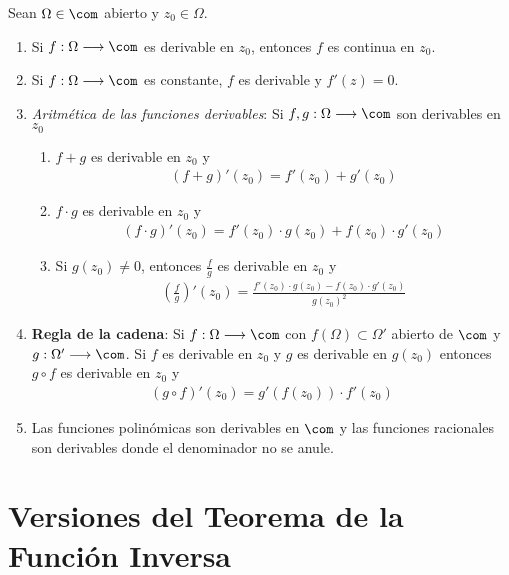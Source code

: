 \begin{obs}
Sean $\Omega \in \com$ abierto y $z_0 \in \Omega$.
\begin{enumerate}
    \item Si $f : \Omega \longrightarrow \com$ es derivable en $z_0$, entonces $f$ es continua en $z_0$.
    \item Si $f: \Omega \longrightarrow \com$ es constante, $f$ es derivable y $f'(z) = 0$.
    \item \textit{Aritmética de las funciones derivables}: Si $f,g: \Omega \longrightarrow \com$ son derivables en $z_0$
    \begin{enumerate}
        \item $f + g$ es derivable en $z_0$ y 
        \begin{align*}
            (f + g)'(z_0) = f'(z_0) + g'(z_0)
        \end{align*}
        \item $f \cdot g$ es derivable en $z_0$ y 
        \begin{align*}
            (f \cdot g)'(z_0) = f'(z_0)\cdot g(z_0) + f(z_0) \cdot g'(z_0)
        \end{align*}
        \item Si $g(z_0) \not = 0$, entonces $\frac{f}{g}$ es derivable en $z_0$ y 
        \begin{align*}
            \left(\frac{f}{g}\right)'(z_0) = \frac{f'(z_0)\cdot g(z_0) - f(z_0) \cdot g'(z_0)}{g(z_0)^2}
        \end{align*}
    \end{enumerate}
    \item \textbf{Regla de la cadena}: Si $f : \Omega \longrightarrow \com$ con $f(\Omega) \subset \Omega'$ abierto de $\com$ y $g : \Omega' \longrightarrow \com$. Si $f$ es derivable en $z_0$ y $g$ es derivable en $g(z_0)$ entonces $g \circ f$ es derivable en $z_0$ y 
    \begin{align*}
        (g \circ f)'(z_0) = g'(f(z_0)) \cdot f'(z_0)
    \end{align*}
    \item Las funciones polinómicas son derivables en $\com$ y las funciones racionales son derivables donde el denominador no se anule.
\end{enumerate}
\end{obs}

\section{Versiones del Teorema de la Función Inversa}

